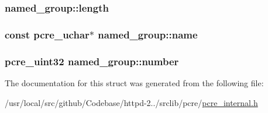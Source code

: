 \subsubsection[{\texorpdfstring{length}{length}}]{ named\+\_\+group\+::length}\hypertarget{structnamed__group_a1aa1208b3c81a320c85ab8cd3da21d50}{}\label{structnamed__group_a1aa1208b3c81a320c85ab8cd3da21d50}
\subsubsection[{\texorpdfstring{name}{name}}]{\setlength{\rightskip}{0pt plus 5cm}const {\bf pcre\+\_\+uchar}$\ast$ named\+\_\+group\+::name}\hypertarget{structnamed__group_ac5ed274a3d3679fece026efa17218163}{}\label{structnamed__group_ac5ed274a3d3679fece026efa17218163}
\subsubsection[{\texorpdfstring{number}{number}}]{\setlength{\rightskip}{0pt plus 5cm}pcre\+\_\+uint32 named\+\_\+group\+::number}\hypertarget{structnamed__group_a08e3aa8190d8914811fcbfc6b3b7670f}{}\label{structnamed__group_a08e3aa8190d8914811fcbfc6b3b7670f}


The documentation for this struct was generated from the following file\+:\begin{DoxyCompactItemize}
\item 
/usr/local/src/github/\+Codebase/httpd-\/2../srclib/pcre/\hyperlink{pcre__internal_8h}{pcre\+\_\+internal.\+h}\end{DoxyCompactItemize}
